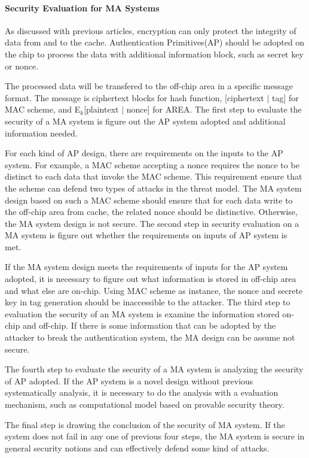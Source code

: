 \documentclass{article}
\begin{document}
\paragraph{Security Evaluation for MA Systems}
As discussed with previous articles, encryption can only protect the integrity of data from and to the cache. Authentication Primitives(AP) should be adopted on the chip to process the data with additional information block, such as secret key or nonce. 

The processed data will be transfered to the off-chip area in a specific message format. The message is ciphertext blocks for hash function, [ciphertext $\mid$ tag] for MAC scheme, and E$_k$[plaintext $\mid$ nonce] for AREA. The first step to evaluate the security of a MA system is figure out the AP system adopted and additional information needed. 

For each kind of AP design, there are requirements on the inputs to the AP system. For example, a MAC scheme accepting a nonce requires the nonce to be distinct to each data that invoke the MAC scheme. This requirement ensure that the scheme can defend two types of attacks in the threat model. The MA system design based on such a MAC scheme should ensure that for each data write to the off-chip area from cache, the related nonce should be distinctive. Otherwise, the MA system design is not secure. The second step in security evaluation on a MA system is figure out whether the requirements on inputs of AP system is met.

If the MA system design meets the requirements of inputs for the AP system adopted, it is necessary to figure out what information is stored in off-chip area and what else are on-chip. Using MAC scheme as instance, the nonce and secrete key in tag generation should be inaccessible to the attacker.  
The third step to evaluation the security of an MA system is examine the information stored on-chip and off-chip. If there is some information that can be adopted by the attacker to break the authentication system, the MA design can be assume not secure.

The fourth step to evaluate the security of a MA system is analyzing the security of AP adopted. If the AP system is a novel design without previous systematically analysis, it is necessary to do the analysis with a evaluation mechanism, such as computational model based on provable security theory.

The final step is drawing the conclusion of the security of MA system. If the system does not fail in any one of previous four steps, the MA system is secure in general security notions and can effectively defend some kind of attacks.
\end{document}
